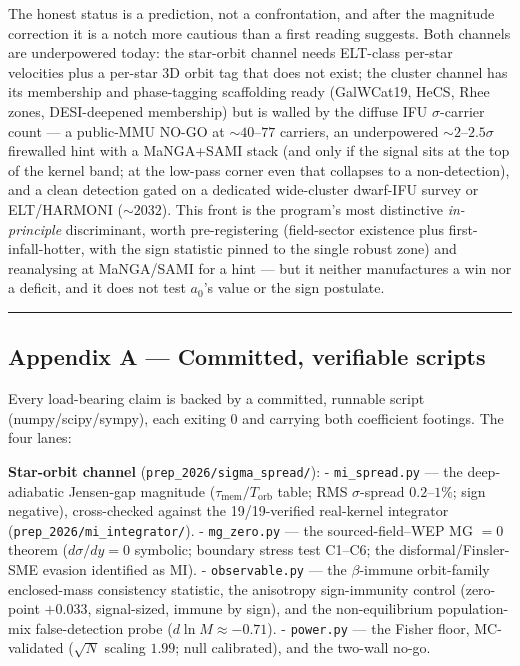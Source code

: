 \documentclass[
]{article}
\begin{document}
The honest status is a prediction, not a confrontation, and after the
magnitude correction it is a notch more cautious than a first reading
suggests. Both channels are underpowered today: the star-orbit channel
needs ELT-class per-star velocities plus a per-star 3D orbit tag that
does not exist; the cluster channel has its membership and phase-tagging
scaffolding ready (GalWCat19, HeCS, Rhee zones, DESI-deepened
membership) but is walled by the diffuse IFU \(\sigma\)-carrier count
--- a public-MMU NO-GO at \(\sim40\)--\(77\) carriers, an underpowered
\(\sim2\)--\(2.5\sigma\) firewalled hint with a MaNGA+SAMI stack (and
only if the signal sits at the top of the kernel band; at the low-pass
corner even that collapses to a non-detection), and a clean detection
gated on a dedicated wide-cluster dwarf-IFU survey or ELT/HARMONI
(\(\sim2032\)). This front is the program's most distinctive
\emph{in-principle} discriminant, worth pre-registering (field-sector
existence plus first-infall-hotter, with the sign statistic pinned to
the single robust zone) and reanalysing at MaNGA/SAMI for a hint --- but
it neither manufactures a win nor a deficit, and it does not test
\(a_0\)'s value or the sign postulate.

\begin{center}\rule{0.5\linewidth}{0.5pt}\end{center}

\subsection{Appendix A --- Committed, verifiable
scripts}\label{appendix-a-committed-verifiable-scripts}

Every load-bearing claim is backed by a committed, runnable script
(numpy/scipy/sympy), each exiting 0 and carrying both coefficient
footings. The four lanes:

\textbf{Star-orbit channel} (\texttt{prep\_2026/sigma\_spread/}): -
\texttt{mi\_spread.py} --- the deep-adiabatic Jensen-gap magnitude
(\(\tau_\mathrm{mem}/T_\mathrm{orb}\) table; RMS \(\sigma\)-spread
\(0.2\)--\(1\%\); sign negative), cross-checked against the
19/19-verified real-kernel integrator
(\texttt{prep\_2026/mi\_integrator/}). - \texttt{mg\_zero.py} --- the
sourced-field--WEP MG \(=0\) theorem (\(d\sigma/dy=0\) symbolic;
boundary stress test C1--C6; the disformal/Finsler-SME evasion
identified as MI). - \texttt{observable.py} --- the \(\beta\)-immune
orbit-family enclosed-mass consistency statistic, the anisotropy
sign-immunity control (zero-point \(+0.033\), signal-sized, immune by
sign), and the non-equilibrium population-mix false-detection probe
(\(d\ln M\approx-0.71\)). - \texttt{power.py} --- the Fisher floor,
MC-validated (\(\sqrt N\) scaling \(1.99\); null calibrated), and the
two-wall no-go.
\end{document}
